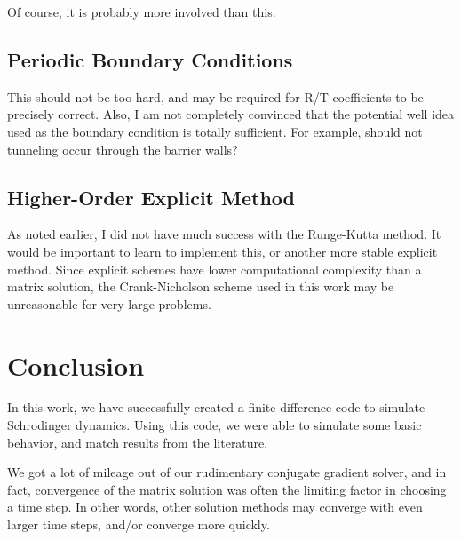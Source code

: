 \documentclass[letterpaper,12pt]{article}
\begin{document}
Of course, it is probably more involved than this.

\subsection{Periodic Boundary Conditions}

This should not be too hard, and may be required for R/T coefficients to be precisely correct. Also, I am not completely convinced that the potential well idea used as the boundary condition is totally sufficient. For example, should not tunneling occur through the barrier walls?

\subsection{Higher-Order Explicit Method}

As noted earlier, I did not have much success with the Runge-Kutta method.  It would be important to learn to implement this, or another more stable explicit method.  Since explicit schemes have lower computational complexity than a matrix solution, the Crank-Nicholson scheme used in this work may be unreasonable for very large problems.  
\section{Conclusion}

In this work, we have successfully created a finite difference code to simulate Schrodinger dynamics.  Using this code, we were able to simulate some basic behavior, and match results from the literature.  

We got a lot of mileage out of our rudimentary conjugate gradient solver, and in fact, convergence of the matrix solution was often the limiting factor in choosing a time step.  In other words, other solution methods may converge with even larger time steps, and/or converge more quickly.



\end{document}
